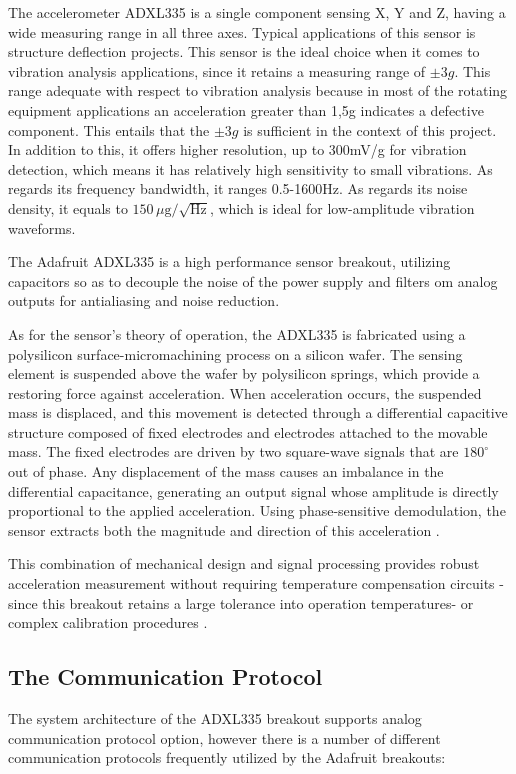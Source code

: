 {{{The accelerometer ADXL335 is a single component sensing X, Y and Z, having a wide measuring range in all three axes. Typical applications of this sensor is structure deflection projects. This sensor is the ideal choice when it comes to vibration analysis applications, since it retains a measuring range of $\pm 3g$. This range adequate with respect to vibration analysis because in most of the rotating equipment applications an acceleration greater than 1,5g indicates a defective component. This entails that the $\pm 3g$ is sufficient in the context of this project. In addition to this, it offers higher resolution, up to 300mV/g for vibration detection, which means it has relatively high sensitivity to small vibrations. As regards its frequency bandwidth, it ranges 0.5-1600Hz. As regards its noise density, it equals to $150\,\mu\text{g}/\sqrt{\text{Hz}}$, which is ideal for low-amplitude vibration waveforms\cite{ADXL335}.

The Adafruit ADXL335 is a high performance sensor breakout, utilizing capacitors so as to decouple the noise of the power supply and filters om analog outputs for antialiasing and noise reduction. 

As for the sensor's theory of operation, the ADXL335 is fabricated using a polysilicon surface-micromachining process on a silicon wafer. The sensing element is suspended above the wafer by polysilicon springs, which provide a restoring force against acceleration. When acceleration occurs, the suspended mass is displaced, and this movement is detected through a differential capacitive structure composed of fixed electrodes and electrodes attached to the movable mass. The fixed electrodes are driven by two square-wave signals that are $180^{\circ}$ out of phase. Any displacement of the mass causes an imbalance in the differential capacitance, generating an output signal whose amplitude is directly proportional to the applied acceleration. Using phase-sensitive demodulation, the sensor extracts both the magnitude and direction of this acceleration \cite{ADXL335}. 

This combination of mechanical design and signal processing provides robust acceleration measurement without requiring temperature compensation circuits -since this breakout retains a large tolerance into operation temperatures- or complex calibration procedures \cite{ADXL335}.



	\subsection{The Communication Protocol}
	{		
The system architecture of the ADXL335 breakout supports analog communication protocol option, however there is a number of different communication protocols frequently utilized by the Adafruit breakouts:
		
}}}}
